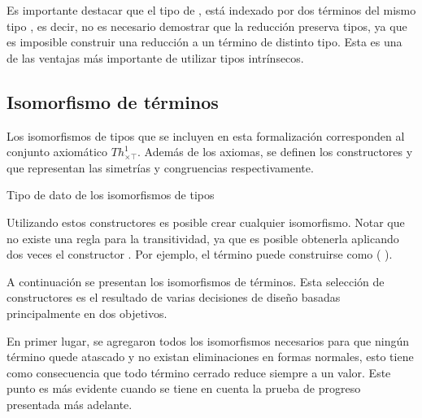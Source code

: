 \documentclass[]{report}
\begin{document}
	Es importante destacar que el tipo de \AgdaDatatype{$\_\hookrightarrow\_$}, está indexado por dos términos del mismo tipo , es decir, no es necesario demostrar que la reducción preserva tipos, ya que es imposible construir una reducción a un término de distinto tipo.
	Esta es una de las ventajas más importante de utilizar tipos intrínsecos.
	
	
	\subsection{Isomorfismo de términos}
	
	Los isomorfismos de tipos que se incluyen en esta formalización corresponden al conjunto axiomático $Th^1_{\times\top}$.
	Además de los axiomas, se definen los constructores  y  que representan las simetrías y congruencias respectivamente.
	
	\begin{codigo}
		Tipo de dato de los isomorfismos de tipos
		
	\end{codigo}
	
	Utilizando estos constructores es posible crear cualquier isomorfismo.
	Notar que no existe una regla para la transitividad, ya que es posible obtenerla aplicando dos veces el constructor \AgdaInductiveConstructor{$[\_]\equiv\_$}. Por ejemplo, el término \AgdaInductiveConstructor{[ trans}   \AgdaInductiveConstructor{]$\equiv$}  puede construirse como  \AgdaInductiveConstructor{[}  \AgdaInductiveConstructor{]$\equiv$} (\AgdaInductiveConstructor{[}  \AgdaInductiveConstructor{]$\equiv$} ).
	
	A continuación se presentan los isomorfismos de términos.
	Esta selección de constructores es el resultado de varias decisiones de diseño basadas principalmente en dos objetivos.
	
	En primer lugar, se agregaron todos los isomorfismos necesarios para que ningún término quede atascado y no existan eliminaciones en formas normales, esto tiene como consecuencia que todo término cerrado reduce siempre a un valor. Este punto es más evidente cuando se tiene en cuenta la prueba de progreso presentada más adelante.
	
\end{document}
